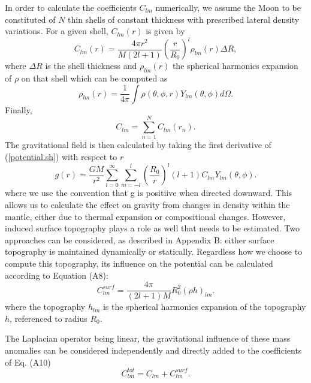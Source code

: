 In order to calculate the coefficients $C_{lm}$ numerically, we assume the Moon to be constituted of
$N$ thin shells of constant thickness with prescribed lateral density variations. For a given shell,
$C_{lm}(r)$ is given by 
%
\begin{equation} \label{eq:clm} C_{lm}(r) = \frac{4\pi r^2}{M(2l+1)} 
\left(\frac{r}{R_0}\right)^{l} \rho_{lm}(r) \Delta R, \end{equation} 
%
where $\Delta R$ is the shell thickness and $\rho_{lm}(r)$ the spherical harmonics expansion of
$\rho$ on that shell which can be computed as
%
\begin{equation} \label{A:rho} \rho_{lm}(r) = \frac{1}{4\pi} \int \rho(\theta,
\phi, r) Y_{lm}(\theta,\phi) d\Omega. \end{equation} 
%
Finally,
\begin{equation} \label{A:rho} C_{lm} = \sum_{n=1}^N C_{lm}(r_n). \end{equation}
%
The gravitational field is then calculated by taking the first derivative of (\ref{potential.sh})
with respect to $r$
%
\begin{equation} g(r) = \frac{GM}{r^2} \sum_{l=0}^{\infty} \sum_{m=-l}^{l} \left(
\frac{R_0}{r}\right)^l (l+1) C_{lm} Y_{lm}(\theta, \phi). \end{equation} 
%
where we use the convention that g is positiive when directed downward. This allows us to calculate
the effect on gravity from changes in density within the mantle, either due to thermal expansion or
compositional changes. However, induced surface topography plays a role as well that needs to be
estimated. Two approaches can be considered, as described in Appendix B: either surface topography
is maintained dynamically or statically. Regardless how we choose to compute this topography, its
influence on the potential can be calculated according to Equation (A8):
%
\begin{equation} C_{lm}^{surf} = \frac{4\pi}{(2l+1)M} R_0^2 (\rho h)_{lm}.
\end{equation} 
%
where the topography $h_{lm}$ is the spherical harmonics expansion of the topography $h$, referenced
to radius $R_0$.

The Laplacian operator being linear, the gravitational influence of these mass anomalies can be
considered independently and directly added to the coefficients of Eq. (A10)
%
 \begin{equation} C_{lm}^{tot} = C_{lm} + C_{lm}^{surf}. \end{equation}




